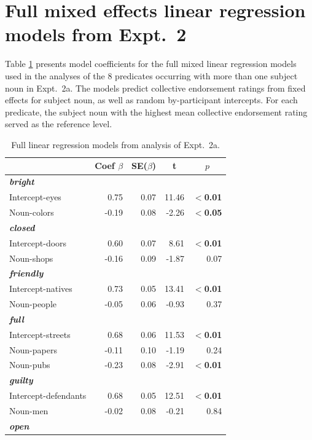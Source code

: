 \documentclass[linguex]{sp}
\begin{document}
\section{Full mixed effects linear regression models from Expt.~2}\label{2-stats}

Table \ref{expt2aanalysis} presents model coefficients for the full mixed linear regression models used in the analyses of the 8 predicates occurring with more than one subject noun in Expt.~2a. The models predict collective endorsement ratings from fixed effects for subject noun, as well as random by-participant intercepts. For each predicate, the subject noun with the highest mean collective endorsement rating served as the reference level.

\begin{table}[htb] 
	\centering \caption{Full linear regression models from analysis of Expt.~2a.} \label{expt2aanalysis}
\begin{tabular}{lrrrr}\toprule
	&	Coef $\beta$	&	SE($\beta$)	&	\multicolumn{1}{c}{ \textbf{t}}	&	\multicolumn{1}{c}{$p$}\\ \midrule
\emph{\textbf{bright}} \\
Intercept-eyes	& 	0.75 &	0.07	&	11.46	&	\textbf{$<$0.01} \\
Noun-colors	&	-0.19	&   0.08	&	-2.26	&	\textbf{$<$0.05} \\ \hline
\emph{\textbf{closed}}\\
Intercept-doors	& 	0.60	&	0.07	&	8.61	&	\textbf{$<$0.01} \\
Noun-shops	&	-0.16	&   0.09	&	-1.87	&	0.07 \\ \hline
\emph{\textbf{friendly}}\\
Intercept-natives	& 	0.73	&	0.05	&	13.41	&	\textbf{$<$0.01} \\
Noun-people	&	-0.05	&   0.06	&	-0.93	&	0.37 \\\hline
\emph{\textbf{full}}\\
Intercept-streets	& 	0.68	&	0.06	&	11.53	&	\textbf{$<$0.01} \\
Noun-papers	&	-0.11	&   0.10	&	-1.19	&	0.24 \\
Noun-pubs	&	-0.23	&   0.08	&	-2.91	&	\textbf{$<$0.01} \\\hline
\emph{\textbf{guilty}}\\
Intercept-defendants	& 	0.68	&	0.05	&	12.51	&	\textbf{$<$0.01} \\
Noun-men	&	-0.02	&   0.08	&	-0.21	&	0.84 \\\hline
\emph{\textbf{open}}\\

\end{tabular}
\end{table}
\end{document}

